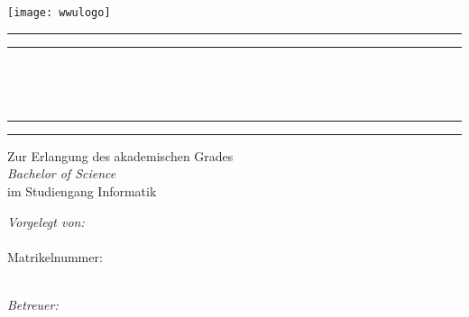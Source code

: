 
\begin{centering}
\texttt{[image: wwulogo]}



\vspace{2cm} 
{
\begin{spacing}{0.15}
{\rule{\linewidth}{.3mm}} \newline  
{\rule{\linewidth}{.2mm}} \\[0.7cm]
\end{spacing}
}

{\LARGE\sffamily
	\textbf{\tTitle}\\[0.7cm]
}
{
	\begin{spacing}{0.15}
		{\rule{\linewidth}{.2mm}} \newline  
		{\rule{\linewidth}{.3mm}} 
	\end{spacing}
}

\vspace{45pt}

{\normalsize\sffamily
	Zur Erlangung des akademischen Grades \\ \textit{Bachelor of Science}\\ im Studiengang Informatik\\[3cm]
}

\hspace*{30pt}
\begin{minipage}[t]{.9\linewidth}
\begin{minipage}[t]{.34\textwidth}
{\sffamily	\textit{Vorgelegt von:} \\
{\large  \sffamily	 \textbf{\tAuthor}}}\\
{\normalsize\sffamily Matrikelnummer: \tStudentId\\
\tMail}\\[1cm]
\end{minipage} 
\hspace{110pt} 
			\begin{minipage}[t]{.38\textwidth}
					\textit{\sffamily Betreuer:}\\	
			\textbf{\large \sffamily \tReviewer}	\\
				{\normalsize\sffamily \tReviewerMail}\\[0.1cm] 
			\textbf{\large\sffamily  		\tSecondAdviser}\\
				{\normalsize\sffamily   \tSecondAdviserMail}\\			
			\end{minipage}
\end{minipage}
\ \\[2cm]
                               

\end{centering}
